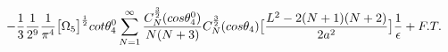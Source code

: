 \begin{equation}
-\frac{1}{3}\frac{1}{2^{9}}\frac{1}{\pi^4}\big{[}\Omega_5\big{]}^{\frac{1}{2}}cot{\theta_4^0}\sum_{N=1}^{\infty}\frac{C_N^{\frac{3}{2}}(cos{\theta_4^0})}{N(N + 3)}C_N^{\frac{3}{2}}(cos{\theta_4})\big{[}\frac{L^2 - 2(N + 1)(N + 2)}{2a^{2}}\big{]}
\frac{1}{\epsilon} + F. T.
\end{equation}

